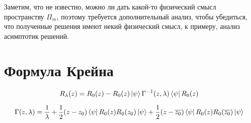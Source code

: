 Заметим, что не известно, можно ли дать какой-то физический смысл пространству $\Pi_m$, поэтому требуется дополнительный анализ, чтобы убедиться, что полученные решения имеют некий физический смысл, к примеру, анализ асимптотик решений.

\section{Формула Крейна}
\[
R_\lambda(z) = R_0(z) - R_0(z) \ket{\psi} \Gamma^{-1}(z, \lambda) \bra{\psi} R_0(z)
\]

\[
\Gamma(z, \lambda) = \frac{1}{\lambda} + \frac{1}{2}(z - z_0) \bra{\psi} R_0(z) R_0(z_0) \ket{\psi} + \frac{1}{2}(z - \overline{z_0}) \bra{\psi} R_0(z) R_0(\overline{z_0}) \ket{\psi}
\]
